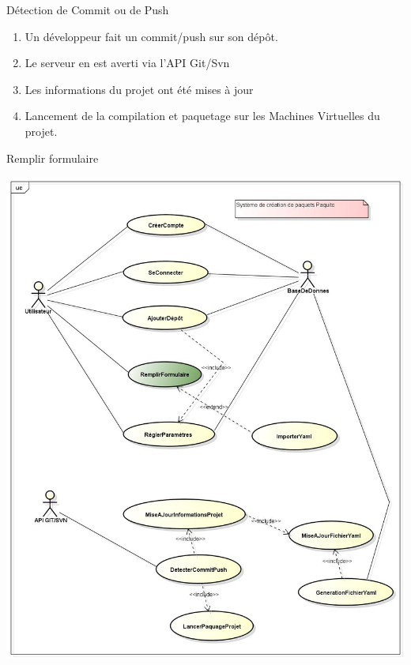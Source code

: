 \documentclass[9pt,xcolor=dvipsnames]{beamer}
\begin{document}
\begin{frame}{Détection de Commit ou de Push}
\begin{minipage}{0.5\textwidth}
\begin{flushright}
\begin{itemize}
        \begin{enumerate}
        \item Un développeur fait un commit/push sur son dépôt.
        \item Le serveur en est averti via l’API Git/Svn
        \item Les informations du projet ont été mises à jour
        \item Lancement de la compilation et paquetage sur les Machines Virtuelles du projet.
        \end{enumerate}
      \end{itemize}
    \end{flushright}
  \end{minipage}
\end{frame}

\begin{frame}{Remplir formulaire}
  \begin{minipage}{0.40\textwidth}
    \begin{flushleft}
      \includegraphics[scale=\largeur]{../img/Diagram_remplirFormulaire.jpg}
    \end{flushleft}

\end{minipage}
\end{frame}
\end{document}
